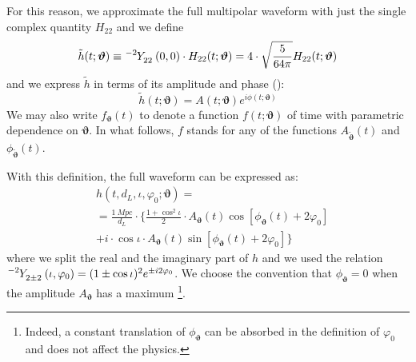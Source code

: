 For this reason, we approximate the full multipolar waveform with just the single complex quantity $H_{22}$ and we define
\begin{equation}\label{eq:h_std}
	\tilde{h}(t; \boldsymbol{\vartheta}) \equiv \tensor[^{-2}]{Y}{_{2 2}}(0,0) \cdot H_{22}(t; \boldsymbol{\vartheta}) = 4\cdot\sqrt{\frac{5}{64\pi}}H_{22}(t; \boldsymbol{\vartheta})
\end{equation}
%
%
and we express $\tilde{h}$ in terms of its amplitude and phase
():
\begin{equation}\label{eq:h_ML}
	\tilde{h}(t; \boldsymbol{\vartheta}) = A(t; \boldsymbol{\vartheta}) e^{i \phi(t; \boldsymbol{\vartheta})} 
\end{equation}
We may also write $f_{\boldsymbol{\vartheta}}(t)$ to denote a function $f(t;\boldsymbol{\vartheta})$ of time with parametric dependence on $\boldsymbol{\vartheta}$.
In what follows, $f$ stands for any of the functions $A_{\tilde{\boldsymbol{\vartheta}}}(t)$ and ${\phi}_{\tilde{\boldsymbol{\vartheta}}}(t)$.
\par
With this definition, the full waveform can be expressed as:
\begin{align} 
	&h(t, d_L,\iota,\varphi_0; \boldsymbol{\vartheta}) =  \nonumber\\
		&= {\frac{\SI{1}{Mpc}}{d_L}} \cdot \Bigg\{ \frac{1+\cos^2\iota}{2} \cdot A_{\boldsymbol{\vartheta}}(t)  \cos[\phi_{\boldsymbol{\vartheta}}(t)+2\varphi_0]  \nonumber \\
		&+ i \cdot \cos\iota \cdot A_{\boldsymbol{\vartheta}}(t) \sin[\phi_{\boldsymbol{\vartheta}}(t)+2\varphi_0] \Bigg\}
\label{eq:h_parametrization_simple}
\end{align}
where we split the real and the imaginary part of $h$ and we used the relation ${\tensor[^{-2}]{Y}{_{2 \pm 2}}(\iota, \varphi_0) = (1 \pm \cos \iota)^2 e^{\pm i 2 \varphi_0}}$.
We choose the convention that $\phi_{\boldsymbol{\vartheta}} = 0$ when the amplitude $A_{\boldsymbol{\vartheta}}$ has a maximum
\footnote{Indeed, a constant translation of $\phi_{\boldsymbol{\vartheta}}$ can be absorbed in the definition of $\varphi_0$ and does not affect the physics.}.
\par
{}

